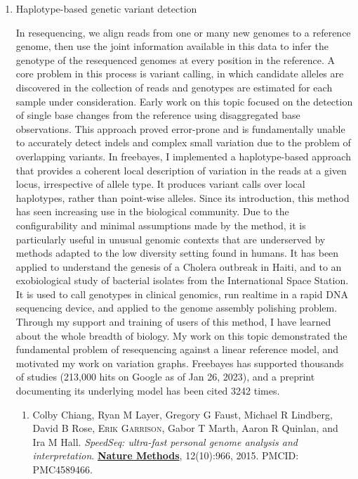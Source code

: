 \documentclass{nihbiosketch}
\newcommand{\hijournal}[1]{{\bf {\uline{#1}}}}
\begin{document}
\begin{enumerate}

\item Haplotype-based genetic variant detection

In resequencing, we align reads from one or many new genomes to a reference genome, then use the joint information available in this data to infer the genotype of the resequenced genomes at every position in the reference. A core problem in this process is variant calling, in which candidate alleles are discovered in the collection of reads and genotypes are estimated for each sample under consideration. Early work on this topic focused on the detection of single base changes from the reference using disaggregated base observations. This approach proved error-prone and is fundamentally unable to accurately detect indels and complex small variation due to the problem of overlapping variants. In freebayes, I implemented a haplotype-based approach that provides a coherent local description of variation in the reads at a given locus, irrespective of allele type. It produces variant calls over local haplotypes, rather than point-wise alleles. Since its introduction, this method has seen increasing use in the biological community. Due to the configurability and minimal assumptions made by the method, it is particularly useful in unusual genomic contexts that are underserved by methods adapted to the low diversity setting found in humans. It has been applied to understand the genesis of a Cholera outbreak in Haiti, and to an exobiological study of bacterial isolates from the International Space Station. It is used to call genotypes in clinical genomics, run realtime in a rapid DNA sequencing device, and applied to the genome assembly polishing problem. Through my support and training of users of this method, I have learned about the whole breadth of biology. My work on this topic demonstrated the fundamental problem of resequencing against a linear reference model, and motivated my work on variation graphs. Freebayes has supported thousands of studies (213,000 hits on Google as of Jan 26, 2023), and a preprint documenting its underlying model has been cited 3242 times.

  \begin{enumerate} %

  \item Colby Chiang, Ryan M Layer, Gregory G Faust, Michael R Lindberg, David B Rose, \textsc{Erik Garrison}, Gabor T Marth, Aaron R Quinlan, and Ira M Hall. \emph{SpeedSeq: ultra-fast personal genome analysis and interpretation}. \hijournal{Nature Methods}, 12(10):966, 2015. PMCID: PMC4589466.


\end{enumerate}
\end{enumerate}
\end{document}
